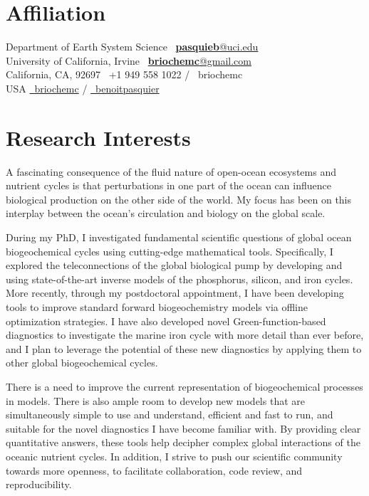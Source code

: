 \documentclass[12pt]{friggeri-cv}
\begin{document}

\section{Affiliation}


Department of Earth System Science \hfill
  \faEnvelope~\href{mailto:pasquieb@uci.edu}{\textbf{pasquieb}@uci.edu} \\
University of California, Irvine \hfill
  \faEnvelope~\href{mailto:briochemc@gmail.com}{\textbf{briochemc}@gmail.com} \\
California, CA, 92697 \hfill
\faMobile~+1 949 558 1022 / \faSkype~briochemc\\
USA \hfill
  \href{https://github.com/briochemc}{\faGithub~briochemc} 
    / \href{https://gitlab.com/benoitpasquier}{\faGitlab~benoitpasquier}



\section{Research Interests}
A fascinating consequence of the fluid nature of open-ocean ecosystems and nutrient cycles is that perturbations in one part of the ocean can influence biological production on the other side of the world.
My focus has been on this interplay between the ocean's circulation and biology on the global scale.

During my PhD, I investigated fundamental scientific questions of global ocean biogeochemical cycles using cutting-edge mathematical tools.
Specifically, I explored the teleconnections of the global biological pump by developing and using state-of-the-art inverse models of the phosphorus, silicon, and iron cycles.
More recently, through my postdoctoral appointment, I have been developing tools to improve standard forward biogeochemistry models via offline optimization strategies.
I have also developed novel Green-function-based diagnostics to investigate the marine iron cycle with more detail than ever before, and I plan to leverage the potential of these new diagnostics by applying them to other global biogeochemical cycles.

There is a need to improve the current representation of biogeochemical processes in models.
There is also ample room to develop new models that are simultaneously simple to use and understand, efficient and fast to run, and suitable for the novel diagnostics I have become familiar with.
By providing clear quantitative answers, these tools help decipher complex global interactions of the oceanic nutrient cycles.
In addition, I strive to push our scientific community towards more openness, to facilitate collaboration, code review, and reproducibility.
\end{document}
